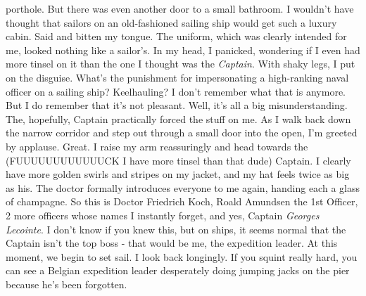 \documentclass{article}
\begin{document}
  porthole. But there was even another door to a small bathroom. I wouldn't have thought that sailors on an
  old-fashioned sailing ship would get such a luxury cabin. Said and bitten my tongue. The uniform, which was
  clearly intended for me, looked nothing like a sailor's. In my head, I panicked, wondering if I even had more
  tinsel on it than the one I thought was the \textit{Captain}. With shaky legs, I put on the disguise. What's the
  punishment for impersonating a high-ranking naval officer on a sailing ship? Keelhauling? I don't remember what
  that is anymore. But I do remember that it's not pleasant. Well, it's all a big misunderstanding. The,
  hopefully,
  Captain practically forced the stuff on me. As I walk back down the narrow corridor and step out through a small
  door into the open, I'm greeted by applause. Great. I raise my arm reassuringly and head towards the
  (FUUUUUUUUUUUUCK I have more tinsel than that dude) Captain. I clearly have more golden swirls and stripes on my
  jacket, and my hat feels twice as big as his. The doctor formally introduces everyone to me again, handing each
  a
  glass of champagne. So this is Doctor Friedrich Koch, Roald Amundsen the 1st Officer, 2 more officers whose
  names
  I instantly forget, and yes, Captain \textit{Georges Lecointe}. I don't know if you knew this, but on ships, it
  seems normal that the Captain isn't the top boss - that would be me, the expedition leader. At this moment, we
  begin to set sail. I look back longingly. If you squint really hard, you can see a Belgian expedition leader
  desperately doing jumping jacks on the pier because he's been forgotten.\\
\end{document}
